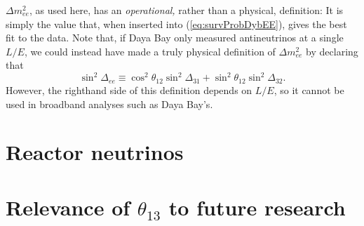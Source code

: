 \documentclass[../thesis.tex]{subfiles}
\begin{document}
$\Delta m^2_{ee}$, as used here, has an \emph{operational,} rather than a physical, definition: It is simply the value that, when inserted into (\ref{eq:survProbDybEE}), gives the best fit to the data. Note that, if Daya Bay only measured antineutrinos at a single $L/E$, we could instead have made a truly physical definition of $\Delta m^2_{ee}$ by declaring that
\[ \sin^2 \Delta_{ee} \equiv \cos^2\theta_{12} \sin^2 \Delta_{31}
  + \sin^2\theta_{12} \sin^2 \Delta_{32}. \]
However, the righthand side of this definition depends on $L/E$, so it cannot be used in broadband analyses such as Daya Bay's.



\section{Reactor neutrinos}
\label{sec:introReactor}

\section{Relevance of $\theta_{13}$ to future research}
\label{sec:futureRelevance}
\end{document}
